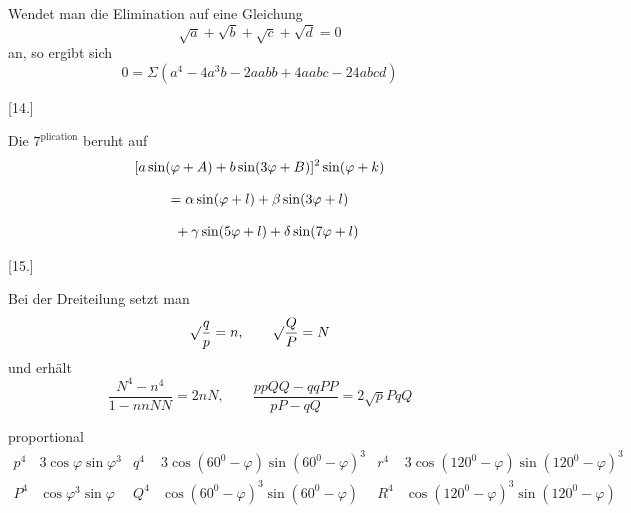 
Wendet man die Elimination auf eine Gleichung
\[
\surd a+\surd b+\surd c+\surd d=0
\]
an, so ergibt sich
\[
0=\Sigma(a^4-4a^3b-2aabb+4aabc-24abcd)
\]


\par\medskip{}\centerline{[14.]}\nobreak\smallskip
Die $7^{\mathrm{plication}}$ beruht auf
\[
\begin{gathered}
\relax[a\sin(\varphi+A)+b\sin(3\varphi+B)]^2\sin(\varphi+k)\\[8pt]
=\alpha\sin(\varphi+l)
 +\beta\sin(3\varphi+l)
 \\[8pt]\quad{}+\gamma\sin(5\varphi+l)+\delta\sin(7\varphi+l)
\end{gathered}
\]


\par\medskip{}\centerline{[15.]}\nobreak\smallskip
Bei der Dreiteilung setzt man
\[
\surd\frac{q}{p}=n,\qquad \surd\frac{Q}{P}=N
\]
und erhält
\[
\frac{N^{4}
 -n^{4}}{1-nnNN}
 =2nN,\qquad
\frac{ppQQ-qqPP}{pP-qQ}=2\surd pPqQ
\]

proportional
\begingroup\small\setlength{\arraycolsep}{1.5pt}\[
\begin{array}{c|l||c|l||c|l}
p^4&3\cos\varphi\sin\varphi^3
&q^4&3\cos(60^0-\varphi)\sin(60^0-\varphi)^3
&r^4&3\cos(120^0-\varphi)\sin(120^0-\varphi)^3\\[8pt]
P^4&\cos\varphi^3\sin\varphi
&Q^4&\cos(60^0-\varphi)^3\sin(60^0-\varphi)
&R^4&\cos(120^0-\varphi)^3\sin(120^0-\varphi)
\end{array}
\]\endgroup

\clearpage
\endgroup
